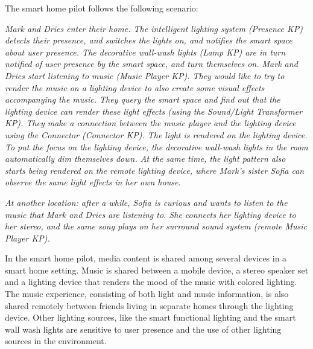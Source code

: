 The smart home pilot follows the following scenario:

\textit{Mark and Dries enter their home. The intelligent lighting system (Presence KP) detects their presence, and switches the lights on, and notifies the smart space about user presence. The decorative wall-wash lights (Lamp KP) are in turn notified of user presence by the smart space, and turn themselves on. Mark and Dries start listening to music (Music Player KP). They would like to try to render the music on a lighting device to also create some visual effects accompanying the music. They query the smart space and find out that the lighting device can render these light effects (using the Sound/Light Transformer KP). They make a connection between the music player and the lighting device using the Connector (Connector KP). The light is rendered on the lighting device. To put the focus on the lighting device, the decorative wall-wash lights in the room automatically dim themselves down. At the same time, the light pattern also starts being rendered on the remote lighting device, where Mark's sister Sofia can observe the same light effects in her own house.}

\textit{At another location: after a while, Sofia is curious and wants to listen to the music that Mark and Dries are listening to. She connects her lighting device to her stereo, and the same song plays on her surround sound system (remote Music Player KP).}




In the smart home pilot, media content is shared among several devices in a smart home setting. Music is shared between a mobile device, a stereo speaker set and a lighting device that renders the mood of the music with colored lighting. The music experience, consisting of both light and music information, is also shared remotely between friends living in separate homes through the lighting device. Other lighting sources, like the smart functional lighting and the smart wall wash lights are sensitive to user presence and the use of other lighting sources in the environment.

